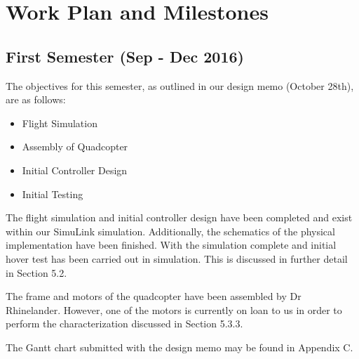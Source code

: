 \section{Work Plan and Milestones}

\subsection{First Semester (Sep - Dec 2016)}
The objectives for this semester, as outlined in our design memo (October 28th), are as follows:

\begin{itemize}
	\item Flight Simulation
	\item Assembly of Quadcopter
	\item Initial Controller Design
	\item Initial Testing
\end{itemize}

The flight simulation and initial controller design have been completed and exist within our SimuLink simulation.  Additionally, the schematics of the physical implementation have been finished.  With the simulation complete and initial hover test has been carried out in simulation.  This is discussed in further detail in Section 5.2.

The frame and motors of the quadcopter have been assembled by Dr Rhinelander.  However, one of the motors is currently on loan to us in order to perform the characterization discussed in Section 5.3.3.

The Gantt chart submitted with the design memo may be found in Appendix C.

